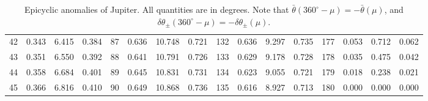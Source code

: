 \begin{table}[!h]
{\begin{tabular}{rrrr|rrrr|rrrr|rrrr}
 42 & \tiny{  0.343} &   6.415 & \tiny{  0.384} &  87 & \tiny{  0.636} &  10.748 & \tiny{  0.721} & 132 & \tiny{  0.636} &   9.297 & \tiny{  0.735} & 177 & \tiny{  0.053} &   0.712 & \tiny{  0.062}\\
 43 & \tiny{  0.351} &   6.550 & \tiny{  0.392} &  88 & \tiny{  0.641} &  10.791 & \tiny{  0.726} & 133 & \tiny{  0.629} &   9.178 & \tiny{  0.728} & 178 & \tiny{  0.035} &   0.475 & \tiny{  0.042}\\
 44 & \tiny{  0.358} &   6.684 & \tiny{  0.401} &  89 & \tiny{  0.645} &  10.831 & \tiny{  0.731} & 134 & \tiny{  0.623} &   9.055 & \tiny{  0.721} & 179 & \tiny{  0.018} &   0.238 & \tiny{  0.021}\\
 45 & \tiny{  0.366} &   6.816 & \tiny{  0.410} &  90 & \tiny{  0.649} &  10.868 & \tiny{  0.736} & 135 & \tiny{  0.616} &   8.927 & \tiny{  0.713} & 180 & \tiny{  0.000} &   0.000 & \tiny{  0.000}\\
\end{tabular}}
\caption{Epicyclic anomalies of Jupiter. All quantities are in degrees. Note that $\bar{\theta}(360^\circ-\mu) = -\bar{\theta}(\mu)$, and $\delta\theta_{\pm}(360^\circ-\mu) = -\delta\theta_{\pm}(\mu)$. }\label{vt13}
\end{table}

